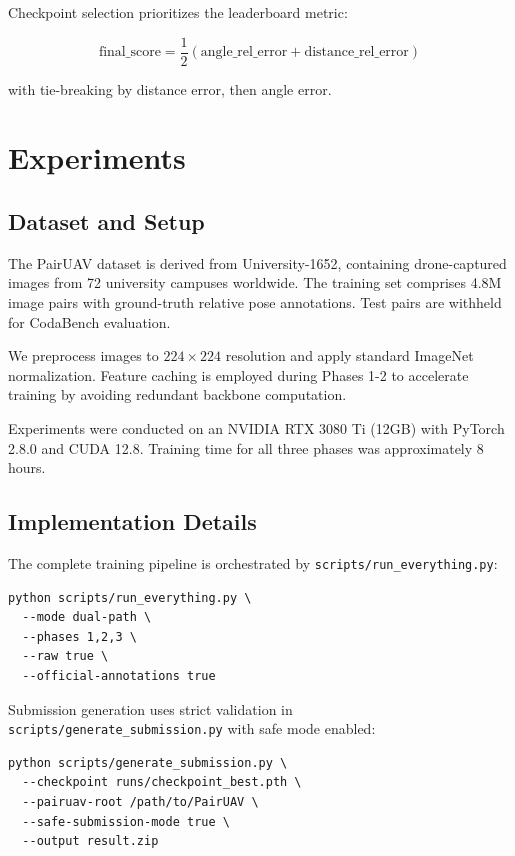 \documentclass[sigconf,nonacm]{acmart}
\begin{document}
Checkpoint selection prioritizes the leaderboard metric:

\begin{equation}
\text{final\_score} = \frac{1}{2}(\text{angle\_rel\_error} + \text{distance\_rel\_error})
\end{equation}

with tie-breaking by distance error, then angle error.

\section{Experiments}

\subsection{Dataset and Setup}

The PairUAV dataset is derived from University-1652, containing drone-captured images from 72 university campuses worldwide. The training set comprises 4.8M image pairs with ground-truth relative pose annotations. Test pairs are withheld for CodaBench evaluation.

We preprocess images to $224 \times 224$ resolution and apply standard ImageNet normalization. Feature caching is employed during Phases 1-2 to accelerate training by avoiding redundant backbone computation.

Experiments were conducted on an NVIDIA RTX 3080 Ti (12GB) with PyTorch 2.8.0 and CUDA 12.8. Training time for all three phases was approximately 8 hours.

\subsection{Implementation Details}

The complete training pipeline is orchestrated by \texttt{scripts/run\_everything.py}:

\begin{lstlisting}[caption={End-to-end training command.}]
python scripts/run_everything.py \
  --mode dual-path \
  --phases 1,2,3 \
  --raw true \
  --official-annotations true
\end{lstlisting}

Submission generation uses strict validation in \texttt{scripts/generate\_submission.py} with safe mode enabled:

\begin{lstlisting}[caption={Submission generation with validation.}]
python scripts/generate_submission.py \
  --checkpoint runs/checkpoint_best.pth \
  --pairuav-root /path/to/PairUAV \
  --safe-submission-mode true \
  --output result.zip
\end{lstlisting}
\end{document}
